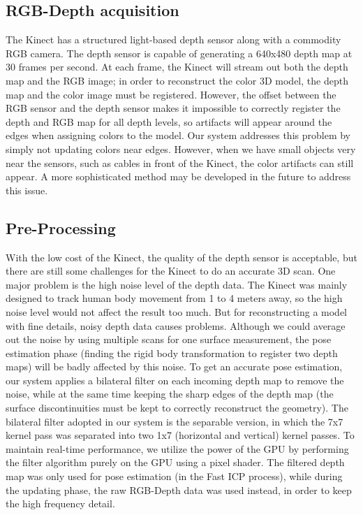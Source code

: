 \documentclass[12pt]{article}
\begin{document}
\subsection{RGB-Depth acquisition}
The Kinect has a structured light-based depth sensor along with a commodity RGB camera. The depth sensor is capable of generating a 640x480 depth map at 30 frames per second. At each frame, the Kinect will stream out both the depth map and the RGB image; in order to reconstruct the color 3D model, the depth map and the color image must be registered. However, the offset between the RGB sensor and the depth sensor makes it impossible to correctly register the depth and RGB map for all depth levels, so artifacts will appear around the edges when assigning colors to the model. Our system addresses this problem by simply not updating colors near edges. However, when we have small objects very near the sensors, such as cables in front of the Kinect, the color artifacts can still appear. A more sophisticated method may be developed in the future to address this issue.

\subsection{Pre-Processing}
With the low cost of the Kinect, the quality of the depth sensor is acceptable, but there are still some challenges for the Kinect to do an accurate 3D scan. One major problem is the high noise level of the depth data. The Kinect was mainly designed to track human body movement from 1 to 4 meters away, so the high noise level would not affect the result too much. But for reconstructing a model with fine details, noisy depth data causes problems. Although we could average out the noise by using multiple scans for one surface measurement, the pose estimation phase (finding the rigid body transformation to register two depth maps) will be badly affected by this noise. To get an accurate pose estimation, our system applies a bilateral filter on each incoming depth map to remove the noise, while at the same time keeping the sharp edges of the depth map (the surface discontinuities must be kept to correctly reconstruct the geometry). The bilateral filter adopted in our system is the separable version, in which the 7x7 kernel pass was separated into two 1x7 (horizontal and vertical) kernel passes. To maintain real-time performance, we utilize the power of the GPU by performing the filter algorithm purely on the GPU using a pixel shader. The filtered depth map was only used for pose estimation (in the Fast ICP process), while during the updating phase, the raw RGB-Depth data was used instead, in order to keep the high frequency detail.
\end{document}
